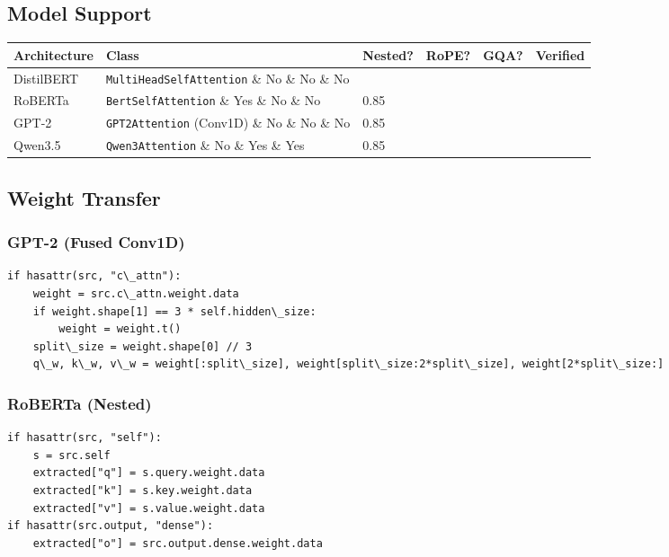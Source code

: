 \subsection{Model Support}

\begin{table}[H]
\centering
\small
\begin{tabular}{llllll}
\toprule
\textbf{Architecture} & \textbf{Class} & \textbf{Nested?} & \textbf{RoPE?} & \textbf{GQA?} & \textbf{Verified} \\
\midrule
DistilBERT & \texttt{MultiHeadSelfAttention} \& No \& No \& No &  \\
RoBERTa & \texttt{BertSelfAttention} \& Yes \& No \& No & 0.85 \\
GPT-2 & \texttt{GPT2Attention} (Conv1D) \& No \& No \& No & 0.85 \\
Qwen3.5 & \texttt{Qwen3Attention} \& No \& Yes \& Yes & 0.85 \\
\bottomrule
\end{tabular}
\end{table}

\subsection{Weight Transfer}

\subsubsection{GPT-2 (Fused Conv1D)}

\begin{lstlisting}
if hasattr(src, "c\_attn"):
    weight = src.c\_attn.weight.data
    if weight.shape[1] == 3 * self.hidden\_size:
        weight = weight.t()
    split\_size = weight.shape[0] // 3
    q\_w, k\_w, v\_w = weight[:split\_size], weight[split\_size:2*split\_size], weight[2*split\_size:]
\end{lstlisting}

\subsubsection{RoBERTa (Nested)}

\begin{lstlisting}
if hasattr(src, "self"):
    s = src.self
    extracted["q"] = s.query.weight.data
    extracted["k"] = s.key.weight.data
    extracted["v"] = s.value.weight.data
if hasattr(src.output, "dense"):
    extracted["o"] = src.output.dense.weight.data
\end{lstlisting}

